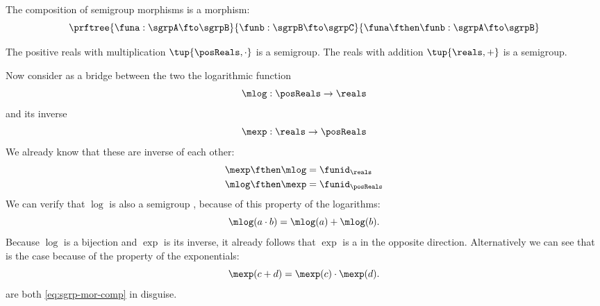 \begin{lemma}
  \label{lem:semigroup-morphisms-compose}
  The composition of semigroup morphisms is a morphism:
  \begin{equation}
    \label{eq:sgrp-mor-compo}
    \prftree{\funa  : \sgrpA \fto \sgrpB}{\funb : \sgrpB \fto \sgrpC}{
      \funa \fthen \funb  : \sgrpA \fto \sgrpB}
  \end{equation}
\end{lemma}
\devel{
  \begin{forslides}
    \begin{equation}
      \label{eq:sgrp-posreals-mult}
      \tup{\posReals, \cdot}
    \end{equation}

    \begin{equation}
      \label{eq:sgrp-reals-plus}
      \tup{\reals, +}
    \end{equation}
  \end{forslides}
}%
\begin{example}
  The positive reals with multiplication  $\tup{\posReals, \cdot}$ is a semigroup.
  The reals with addition $\tup{\reals, +}$ is a semigroup.

  Now consider as a bridge between the two the logarithmic function
  \begin{equation}
    \label{eq:log}
    \mlog :  \posReals \to \reals
  \end{equation}
  and its inverse
  \begin{equation}
    \label{eq:exp}
    \mexp :  \reals \to \posReals
  \end{equation}
  We already know that these are inverse of each other:
  \begin{equation}\label{eq:exp-log-are-inverses}
    \begin{aligned}
      \mexp \fthen \mlog &= \funid_{\reals} \\
      \mlog \fthen \mexp &= \funid_{\posReals}
    \end{aligned}
  \end{equation}
  We can verify that $\log$ is also a semigroup \whomo, because of this property of the logarithms:
  \begin{equation}
    \label{eq:log-property}
    \mlog(a \cdot b) = \mlog(a) + \mlog(b).
  \end{equation}
  Because $\log$ is a bijection and $\exp$ is its inverse, it already follows that $\exp$ is
  a \whomo in the opposite direction.
  Alternatively we can see that is the case because of the property of the exponentials:
  \begin{equation}
    \label{eq:exp-property}
    \mexp(c + d) = \mexp(c) \cdot \mexp(d).
  \end{equation}
   are both \cref{eq:sgrp-mor-comp} in disguise.
\end{example}

